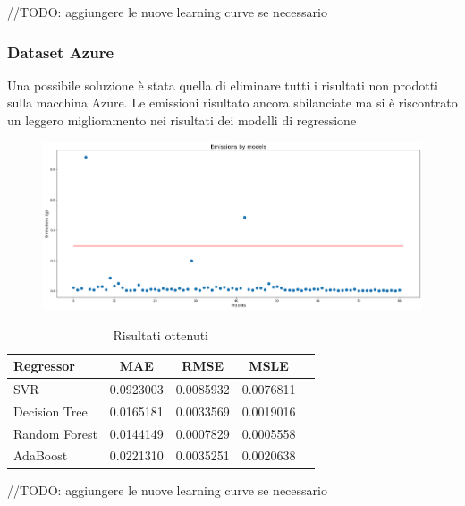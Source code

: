 //TODO: aggiungere le nuove learning curve se necessario

\subsubsection{Dataset Azure}

\noindent Una possibile soluzione è stata quella di eliminare tutti i risultati non prodotti sulla macchina Azure. Le emissioni risultato ancora sbilanciate ma si è riscontrato un leggero miglioramento nei risultati dei modelli di regressione

\begin{figure}[H]
    \centering
    \includegraphics[scale=1.25]{images/nuova-situazione2.png}
\end{figure}



\begin{table}[H]
    \centering
    \begin{tabular}{|>{\centering\arraybackslash}m{5cm}|c|c|c|c|}
        \hline
        \textbf{Regressor} & \textbf{MAE} & \textbf{RMSE} & \textbf{MSLE} \\ [10pt]
        \hline
        SVR & 0.0923003 & 0.0085932 & 0.0076811 \\ [10pt]
        \hline
        Decision Tree & 0.0165181 & 0.0033569 & 0.0019016 \\ [10pt]
        \hline
        Random Forest & 0.0144149 & 0.0007829 & 0.0005558 \\ [10pt]
        \hline
        AdaBoost & 0.0221310 & 0.0035251 & 0.0020638 \\ [10pt]
        \hline
    \end{tabular}
    \caption*{Risultati ottenuti}
    \label{tab:results}
\end{table}

//TODO: aggiungere le nuove learning curve se necessario



